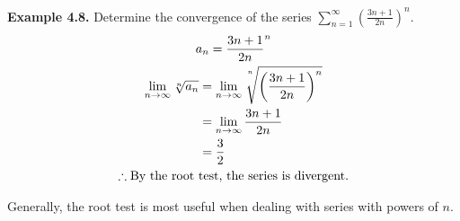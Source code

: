 \documentclass[12pt]{article}
\begin{document}
\textbf{Example 4.8.} Determine the convergence of the series $\displaystyle\sum_{n=1}^{\infty}\left(\frac{3n+1}{2n}\right)^n$.
\begin{gather*}
	a_n = {\frac{3n+1}{2n}}^n   \\
	\begin{aligned}
    \displaystyle\lim_{n\rightarrow\infty}\sqrt[n]{a_n} & = \displaystyle\lim_{n\rightarrow\infty}\sqrt[\uproot{15} n]{\left(\frac{3n+1}{2n}\right)^n}                                                                   \\
                                                        & = \displaystyle\lim_{n\rightarrow\infty}\frac{3n+1}{2n} \\
                                                        & = \frac{3}{2}
	\end{aligned} \\
	\therefore \text{By the root test, the series is divergent.}
\end{gather*}

Generally, the root test is most useful when dealing with series with powers of $n$.
\end{document}
